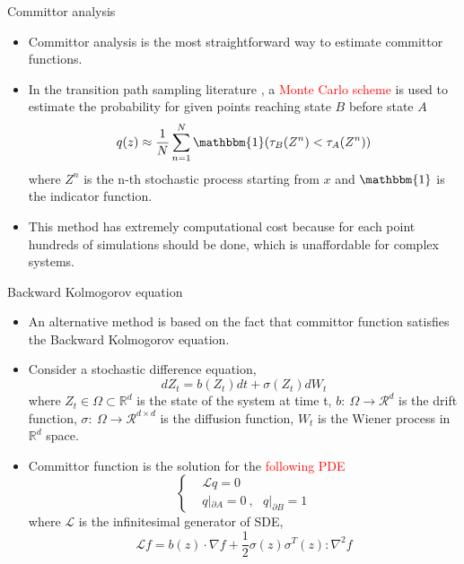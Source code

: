 \documentclass{beamer}
\newcommand{\rred}{\textcolor{red}}
\begin{document}
\begin{frame}{Committor analysis}
\begin{itemize}
    \item Committor analysis is the most straightforward way to estimate committor functions. 
    \item In the transition path sampling literature \cite{Christoph2002,Jung2023,Dellago2006}, a \rred{Monte Carlo scheme} is used to 
     estimate the probability for given points reaching state $B$ before state $A$ 
     \begin{equation*}
        q(z) \approx \frac{1}{N} \sum_{n=1}^N \mathbbm{1}(\tau_B(Z^n)<\tau_A(Z^n))
     \end{equation*}
     where $Z^n$ is the n-th stochastic process starting from $x$ and $\mathbbm{1}$ is the indicator function.
    \item This method has extremely computational cost because for each point hundreds of simulations should be done, which is 
     unaffordable for complex systems. 
\end{itemize}
    
\end{frame}

\begin{frame}{Backward Kolmogorov equation}
\begin{itemize}
    \item An alternative method is based on the fact that committor function satisfies the Backward Kolmogorov equation.
    \item  Consider a stochastic difference equation,
    $$dZ_t = b(Z_t)dt+\sigma(Z_t)dW_t$$
    where $Z_t \in \Omega\subset \mathbb{R}^d$ is the state of the system 
    at time t, $b: \ \Omega  \to \mathcal{R}^d$ is the 
    drift function, 
    $\sigma : \ \Omega  \to \mathcal{R}^{d \times d}$ 
    is the diffusion function, $W_t$ is the Wiener process 
    in $\mathbb{R}^d$ space.
    \item  Committor function is the solution for the \rred{following PDE}
    $$\left\{\begin{aligned}
        &\mathcal{L}q = 0\\
        & q|_{\partial A} = 0\ ,\ \ \ q|_{\partial B} = 1
    \end{aligned}\right.$$
    where $\mathcal{L}$ is the infinitesimal generator of SDE,
    $$\mathcal{L} f = b(z) \cdot \nabla f + \frac{1}{2} \sigma(z)\sigma^T(z):\nabla^2f$$
    
\end{itemize}
    
\end{frame}
\end{document}
